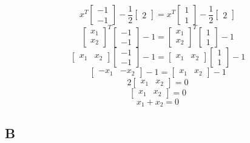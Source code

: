 \documentclass[12pt]{article}
\begin{document}
\[
    x^T\begin{bmatrix} -1 \\ -1\end{bmatrix}-\frac{1}{2}\begin{bmatrix}2\end{bmatrix}
    =
    x^T\begin{bmatrix} 1 \\ 1\end{bmatrix}-\frac{1}{2}\begin{bmatrix}2\end{bmatrix}
\]
\[
    \begin{bmatrix} x_1 \\ x_2\end{bmatrix}^T\begin{bmatrix} -1 \\ -1\end{bmatrix}-1
    =
    \begin{bmatrix} x_1 \\ x_2\end{bmatrix}^T\begin{bmatrix} 1 \\ 1\end{bmatrix} -1
\]
\[
    \begin{bmatrix} x_1 & x_2\end{bmatrix}\begin{bmatrix} -1 \\ -1\end{bmatrix}-1
    =
    \begin{bmatrix} x_1 & x_2\end{bmatrix}\begin{bmatrix} 1 \\ 1\end{bmatrix}-1
\]
\[
    \begin{bmatrix} -x_1 & -x_2\end{bmatrix}-1
    =
    \begin{bmatrix} x_1 & x_2\end{bmatrix}-1
\]
\[
    2\begin{bmatrix} x_1 & x_2\end{bmatrix} = 0
\]
\[
    \begin{bmatrix} x_1 & x_2\end{bmatrix} = 0
\]
\[
    x_1 + x_2 = 0
\]

\subsection{B}
\end{document}
